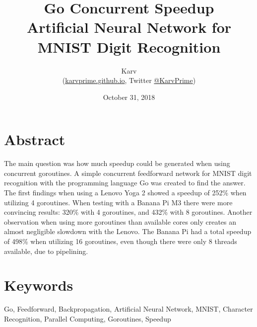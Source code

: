 \documentclass[11pt]{article}
\title{\textbf{Go Concurrent Speedup} \\ Artificial Neural Network for \\ MNIST Digit Recognition}
\author{Karv \\ (\url{karvprime.github.io}, Twitter \href{https://twitter.com/KarvPrime}{@KarvPrime})}
\date{October 31, 2018}
\begin{document}
\maketitle

\newpage

\tableofcontents

\newpage

\section*{Abstract}
The main question was how much speedup could be generated when using concurrent goroutines. A simple concurrent feedforward network for MNIST\cite{MNISTData} digit recognition with the programming language Go\cite{Go,GoBlog,GoTour,GoGithubWiki} was created to find the answer.
The first findings when using a Lenovo Yoga 2 showed a speedup of 252\% when utilizing 4 goroutines. When testing with a Banana Pi M3 there were more convincing results: 320\% with 4 goroutines, and 432\% with 8 goroutines.
Another observation when using more goroutines than available cores only creates an almost negligible slowdown with the Lenovo. The Banana Pi had a total speedup of 498\% when utilizing 16 goroutines, even though there were only 8 threads available, due to pipelining.

\section*{Keywords}
Go, Feedforward, Backpropagation, Artificial Neural Network, MNIST, Character Recognition, Parallel Computing, Goroutines, Speedup

\newpage
\end{document}
